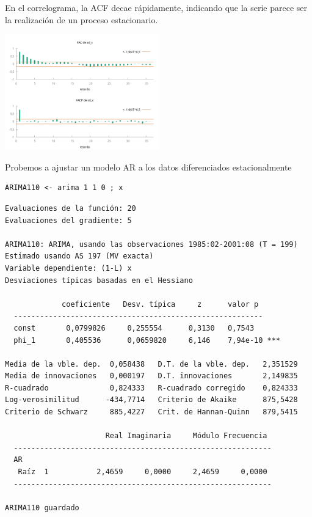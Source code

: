 \documentclass[10pt]{article}
\begin{document}
En el correlograma, la ACF decae rápidamente, indicando que la serie
parece ser la realización de un proceso estacionario.

\begin{center}
\includegraphics[width=0.5\textwidth]{./SegundoEjercicioIdentificacionARIMA/sd_x_ACF-PACF.png}
\end{center}

Probemos a ajustar un modelo AR a los datos diferenciados estacionalmente

\begin{verbatim}
ARIMA110 <- arima 1 1 0 ; x
\end{verbatim}

\begin{verbatim}
Evaluaciones de la función: 20
Evaluaciones del gradiente: 5

ARIMA110: ARIMA, usando las observaciones 1985:02-2001:08 (T = 199)
Estimado usando AS 197 (MV exacta)
Variable dependiente: (1-L) x
Desviaciones típicas basadas en el Hessiano

             coeficiente   Desv. típica     z      valor p 
  ---------------------------------------------------------
  const       0,0799826     0,255554      0,3130   0,7543  
  phi_1       0,405536      0,0659820     6,146    7,94e-10 ***

Media de la vble. dep.  0,058438   D.T. de la vble. dep.   2,351529
Media de innovaciones   0,000197   D.T. innovaciones       2,149835
R-cuadrado              0,824333   R-cuadrado corregido    0,824333
Log-verosimilitud      -434,7714   Criterio de Akaike      875,5428
Criterio de Schwarz     885,4227   Crit. de Hannan-Quinn   879,5415

                       Real Imaginaria     Módulo Frecuencia
  -----------------------------------------------------------
  AR
   Raíz  1           2,4659     0,0000     2,4659     0,0000
  -----------------------------------------------------------

ARIMA110 guardado
\end{verbatim}
\end{document}
